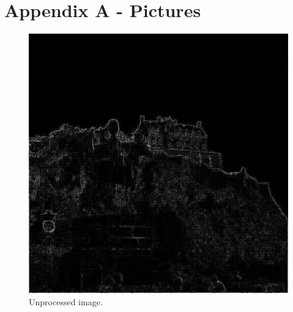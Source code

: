 \documentclass[11pt]{article}
\begin{document}
	\pagebreak
	\section{Appendix A - Pictures} \label{ap1}
	
	\begin{figure}[H]	
		\centering
		\includegraphics[scale=0.23]{edge768x768.jpg}
		\caption{Unprocessed image.}\label{pic0}
	\end{figure}
	
\end{document}

